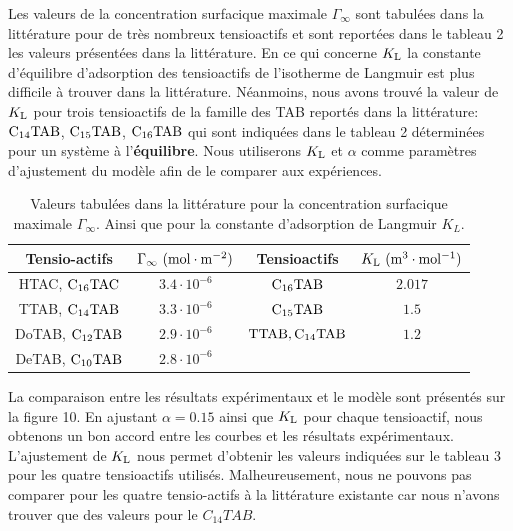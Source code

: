 \documentclass[french, 10pt]{article}
\begin{document}
Les valeurs de la concentration surfacique maximale $\Gamma_{\infty}$ sont tabulées dans la littérature pour de très nombreux tensioactifs et sont reportées dans le tableau 2 les valeurs présentées dans la littérature. En ce qui concerne $K_{\rm L}$ la constante d'équilibre d'adsorption des tensioactifs de l'isotherme de Langmuir est plus difficile à trouver dans la littérature. Néanmoins, nous avons trouvé la valeur de $K_{\rm L}$ pour trois tensioactifs de la famille des TAB reportés dans la littérature: $\rm C_{14}TAB$, $\rm C_{15}TAB$, $\rm C_{16}TAB$ qui sont indiquées dans le tableau 2  déterminées pour un système à l'\textbf{équilibre}. Nous utiliserons $K_{\rm L}$ et $\alpha$ comme paramètres d'ajustement du modèle afin de le comparer aux expériences.

\begin{table}[ht!]
  \centering
  \begin{tabular}{c|c|c|c}
    \hline \hline
    Tensio-actifs & $\Gamma_{\infty}~\rm (mol\cdot m^{-2})$ & Tensioactifs  &$K_{\rm L }~\rm (m^{3}\cdot mol^{-1})$ \\ \hline \hline
    HTAC, $\rm C_{16}TAC$  & $3.4\cdot 10^{-6}$ &$\rm C_{16}TAB$ & $2.017$ \\ 
    TTAB, $\rm C_{14}TAB$  & $3.3\cdot 10^{-6}$ &$\rm C_{15}TAB$ &$1.5$ \\ 
    DoTAB, $\rm C_{12}TAB$  & $2.9\cdot 10^{-6}$ &$\rm TTAB, C_{14}TAB$ &$1.2$ \\ 
    DeTAB, $\rm C_{10}TAB$  & $2.8\cdot 10^{-6}$ & &\\  \hline
  \end{tabular}
  \caption{Valeurs tabulées dans la littérature pour la concentration surfacique maximale $\Gamma_{\infty}$. Ainsi que pour la constante d'adsorption de Langmuir $K_{L}$.}
  \label{TABLE:Paramv0}
\end{table}

La comparaison entre les résultats expérimentaux et le modèle sont présentés sur la figure 10. En ajustant $\alpha=0.15$ ainsi que $K_{\rm L}$ pour chaque tensioactif, nous obtenons un bon accord entre les courbes et les résultats expérimentaux. L'ajustement de $K_{\rm L}$ nous permet d'obtenir les valeurs indiquées sur le tableau 3 pour les quatre tensioactifs utilisés. Malheureusement, nous ne pouvons pas comparer pour les quatre tensio-actifs à la littérature existante car nous n'avons trouver que des valeurs pour le $C_{14}TAB$.
\end{document}
